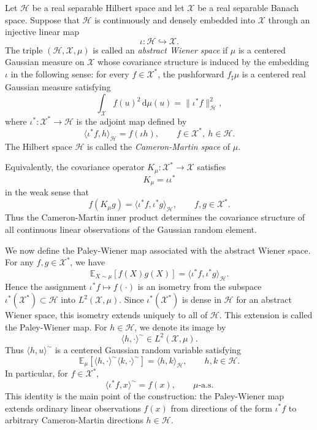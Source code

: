 \documentclass[11pt]{article}
\renewcommand{\d}{\mathrm{d}}
\begin{document}
\begin{definition}
\label{def:abstract_wiener_space}
Let $\mathcal H$ be a real separable Hilbert space and let $\mathcal X$ be a real separable Banach space. Suppose that $\mathcal H$ is continuously and densely embedded into $\mathcal X$ through an injective linear map
\[
    \iota:\mathcal H\hookrightarrow \mathcal X.
\]
The triple $(\mathcal H,\mathcal X,\mu)$ is called an \emph{abstract Wiener space} if $\mu$ is a centered Gaussian measure on $\mathcal X$ whose covariance structure is induced by the embedding $\iota$ in the following sense: for every $f\in\mathcal X^*$, the pushforward $f_\sharp\mu$ is a centered real Gaussian measure satisfying
\[
    \int_{\mathcal X} f(u)^2\,\d\mu(u)
    =
    \|\iota^*f\|_{\mathcal H}^2,
\]
where $\iota^*:\mathcal X^*\to\mathcal H$ is the adjoint map defined by
\[
    \langle \iota^*f,h\rangle_{\mathcal H}
    =
    f(\iota h),
    \qquad f\in\mathcal X^*,\ h\in\mathcal H.
\]
The Hilbert space $\mathcal H$ is called the \emph{Cameron-Martin space} of $\mu$.
\end{definition}
Equivalently, the covariance operator $K_\mu:\mathcal X^*\to\mathcal X$ satisfies
\[
    K_\mu=\iota\iota^*
\]
in the weak sense that
\[
    f(K_\mu g)=
    \langle \iota^* f,\iota^* g\rangle_{\mathcal H},
    \qquad f,g\in\mathcal X^*.
\]
Thus the Cameron-Martin inner product determines the covariance structure of all continuous linear observations of the Gaussian random element.

We now define the Paley-Wiener map associated with the abstract Wiener space. For any $f,g\in\mathcal X^*$, we have
\[
    \mathbb E_{X\sim\mu}\left[f(X)g(X)\right]
    =
    \langle \iota^* f,\iota^* g\rangle_{\mathcal H}.
\]
Hence the assignment $\iota^* f\mapsto f(\cdot)$
is an isometry from the subspace $\iota^*(\mathcal X^*)\subset\mathcal H$ into $L^2(\mathcal X,\mu)$. Since $\iota^*(\mathcal X^*)$ is dense in $\mathcal H$ for an abstract Wiener space, this isometry extends uniquely to all of $\mathcal H$. This extension is called the Paley-Wiener map. For $h\in\mathcal H$, we denote its image by
\[
    \langle h,\cdot\rangle^\sim
    \in L^2(\mathcal X,\mu).
\]
Thus $\langle h,u\rangle^\sim$ is a centered Gaussian random variable satisfying
\[
    \mathbb E_\mu
    \left[
        \langle h,\cdot\rangle^\sim
        \langle k,\cdot\rangle^\sim
    \right]
    =
    \langle h,k\rangle_{\mathcal H},
    \qquad h,k\in\mathcal H.
\]
In particular, for $f\in\mathcal X^*$,
\[
    \langle \iota^*f,x\rangle^\sim
    =
    f(x),
    \qquad \mu\text{-a.s.}
\]
This identity is the main point of the construction: the Paley-Wiener map extends ordinary linear observations $f(x)$ from directions of the form $\iota^*f$ to arbitrary Cameron-Martin directions $h\in\mathcal H$.
\end{document}
